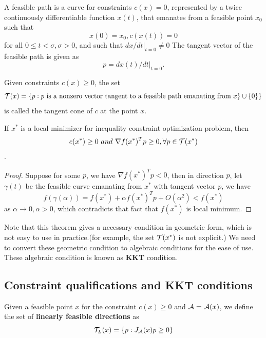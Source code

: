 \begin{refsection}
\begin{definition}
\cite[lec 4]{Robinson2015nonlinear2}A feasible path is a curve for constraints $c(x) = 0$, represented by a twice continuously differentiable function $x(t)$, that emanates from a feasible point $x_0$ such that
$$x(0)=x_0,c(x(t)) = 0$$
for all $0\leq t <\sigma, \sigma > 0$, and such that 
$dx/dt|_{t=0}\neq 0$
The tangent vector of the feasible path is given as 
$$p= dx(t)/dt|_{t=0}.$$
\end{definition}

\begin{definition}
\cite[lec 4]{Robinson2015nonlinear2}Given constraints $c(x) \geq 0$, the set
$$\mathcal{T}(x) = \{p:p ~\text{is a nonzero vector tangent to a feasible path emanating from } x\} \cup \{0\}\}$$
is called the tangent cone of $c$ at the point $x$.
\end{definition}


\begin{theorem}\label{ch:constrained-nonlinear-optimization:th:firstordernecessaryconditiongeoemtricforminequalityconstraint}
\cite[lec 4]{Robinson2015nonlinear2}If $x^*$ is a local minimizer for inequality constraint optimization problem, then $$c(x^*) \geq 0 ~and~  \nabla f(x^*)^T p \geq 0, \forall p\in \mathcal{T}(x^*)$$. 
\end{theorem}
\begin{proof}
Suppose for some $p$, we have $\nabla f(x^*)^T p < 0$, then in direction $p$, let $\gamma(t)$ be the feasible curve emanating from $x^*$ with tangent vector $p$, we have
$$f(\gamma(\alpha)) = f(x^*) + \alpha f(x^*)^T p + O(\alpha^2) < f(x^*)$$
as $\alpha \to 0,\alpha > 0$, which contradicts that fact that $f(x^*)$ is local minimum.
\end{proof}

\begin{remark}
Note that this theorem gives a necessary condition in geometric form, which is not easy to use in practice.(for example, the set $\mathcal{T}(x^*)$ is not explicit.) We need to convert these geometric condition to algebraic conditions for the ease of use. These algebraic condition is known as \textbf{KKT} condition.
\end{remark}


\subsection{Constraint qualifications and KKT conditions }
\begin{definition}\label{ch:constrained-nonlinear-optimization:def:linearFeasibleDirectionInequalityConstraint}
Given a feasible point $x$ for the constraint $c(x) \geq 0$ and $\mathcal{A} = \mathcal{A}(x)$, we define the set of \textbf{linearly feasible directions} as
$$\mathcal{T}_L(x) = \{p: J_{\mathcal{A}}(x)p \geq 0\}$$
\end{definition}


\end{refsection}
